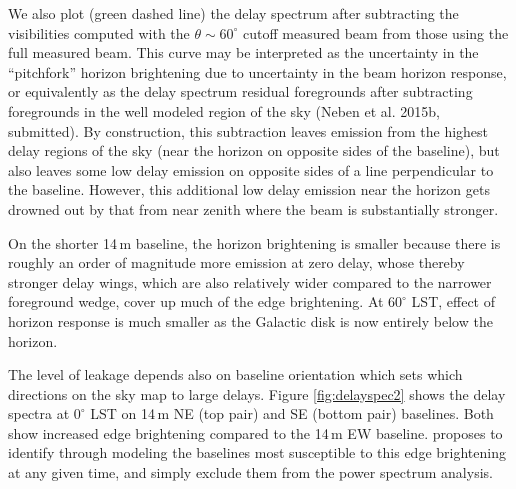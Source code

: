 \documentclass{emulateapj}
\begin{document}
We also plot (green dashed line) the delay spectrum after subtracting the visibilities computed with the $\theta\sim60^\circ$ cutoff measured beam from those using the full measured beam. This curve may be interpreted as the uncertainty in the ``pitchfork'' horizon brightening due to uncertainty in the beam horizon response, or equivalently as the delay spectrum residual foregrounds after subtracting foregrounds in the well modeled region of the sky (Neben et al. 2015b, submitted). By construction, this subtraction leaves emission from the highest delay regions of the sky (near the horizon on opposite sides of the baseline), but also leaves some low delay emission on opposite sides of a line perpendicular to the baseline. However, this additional low delay emission near the horizon gets drowned out by that from near zenith where the beam is substantially stronger. 

On the shorter 14\,m baseline, the horizon brightening is smaller because there is roughly an order of magnitude more emission at zero delay, whose thereby stronger delay wings, which are also relatively wider compared to the narrower foreground wedge, cover up much of the edge brightening. At $60^\circ$ LST, effect of horizon response is much smaller as the Galactic disk is now entirely below the horizon. 

The level of leakage depends also on baseline orientation which sets which directions on the sky map to large delays. Figure \ref{fig:delayspec2} shows the delay spectra at $0^\circ$ LST on 14\,m NE (top pair) and SE (bottom pair) baselines. Both show increased edge brightening compared to the 14\,m EW baseline. \citet{nithya15} proposes to identify through modeling the baselines most susceptible to this edge brightening at any given time, and simply exclude them from the power spectrum analysis. 




\end{document}
